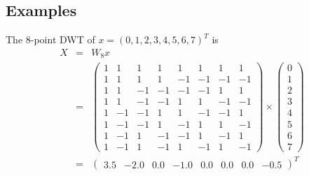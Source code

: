 \subsection{Examples}
The 8-point DWT of $x=(0, 1, 2, 3, 4, 5, 6, 7)^T$ is
\begin{eqnarray}
X &=& W_8 x\\
 &=& \left( \begin{array}{cccccccc}
1& 1& 1& 1& 1& 1& 1& 1\\
1& 1& 1& 1&-1&-1&-1&-1\\
1& 1&-1&-1&-1&-1& 1& 1\\
1& 1&-1&-1& 1& 1&-1&-1\\
1&-1&-1& 1& 1&-1&-1& 1\\
1&-1&-1& 1&-1& 1& 1&-1\\
1&-1& 1&-1&-1& 1&-1& 1\\
1&-1& 1&-1& 1&-1& 1&-1
\end{array} \right)
\times \left( \begin{array}{c}
0\\
1\\
2\\
3\\
4\\
5\\
6\\
7
\end{array} \right) \\
 &=& 
\left( \begin{array}{cccccccc}
3.5 & -2.0 & 0.0 & -1.0 & 0.0 & 0.0 & 0.0 & -0.5
\end{array} \right)^T
\end{eqnarray}

